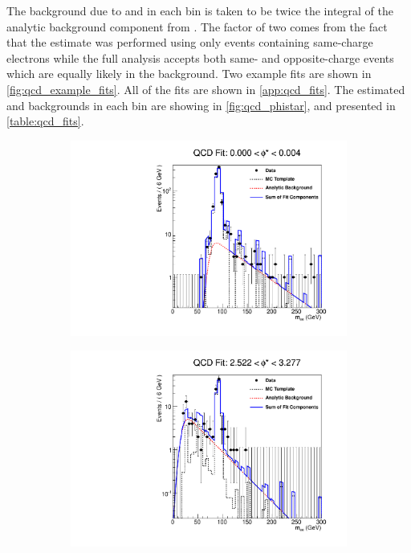 The background due to \QCDjets and \wjets in each \phistar bin is taken to be
twice the integral of the analytic background component from \MassRange. The
factor of two comes from the fact that the estimate was performed using only
events containing same-charge electrons while the full analysis accepts both
same- and opposite-charge events which are equally likely in the background.
Two example fits are shown in \cref{fig:qcd_example_fits}. All of the fits
are shown in \cref{app:qcd_fits}. The estimated \QCDjets and \wjets
backgrounds in each \phistar bin are showing in \cref{fig:qcd_phistar}, and
presented in \cref{table:qcd_fits}.

\begin{figure}[!htbp]
    \centering
    \begin{subfigure}[b]{\SideBySidePlotWidth}
        \includegraphics[width=\linewidth]{figures/qcd_fits/qcd_fit_plot_for_01.pdf}
        \caption{}
        \label{fig:qcd_fit_example_01}
    \end{subfigure}%
    \begin{subfigure}[b]{\SideBySidePlotWidth}
        \includegraphics[width=\linewidth]{figures/qcd_fits/qcd_fit_plot_for_34.pdf}

\end{subfigure}
\end{figure}
